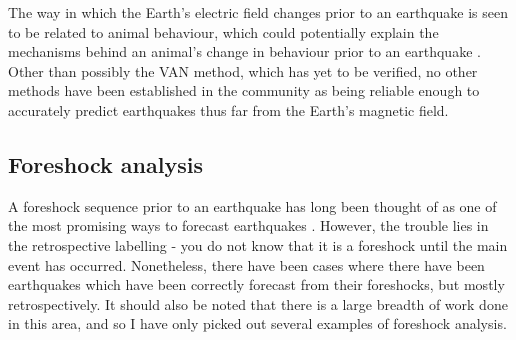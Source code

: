 \documentclass[12pt]{report}
\begin{document}


The way in which the Earth's electric field changes prior to an earthquake is seen to be related to animal behaviour, which could potentially explain the mechanisms behind an animal's change in behaviour prior to an earthquake \citep{Ikeya1996}. Other than possibly the VAN method, which has yet to be verified, no other methods have been established in the community as being reliable enough to accurately predict earthquakes thus far from the Earth's magnetic field.  

\subsection{Foreshock analysis}
A foreshock sequence prior to an earthquake has long been thought of as one of the most promising ways to forecast earthquakes \citep{Papazachos1975, Jones1979}. However, the trouble lies in the retrospective labelling - you do not know that it is a foreshock until the main event has occurred. Nonetheless, there have been cases where there have been earthquakes which have been correctly forecast from their foreshocks, but mostly retrospectively. It should also be noted that there is a large breadth of work done in this area, and so I have only picked out several examples of foreshock analysis. 
\end{document}
